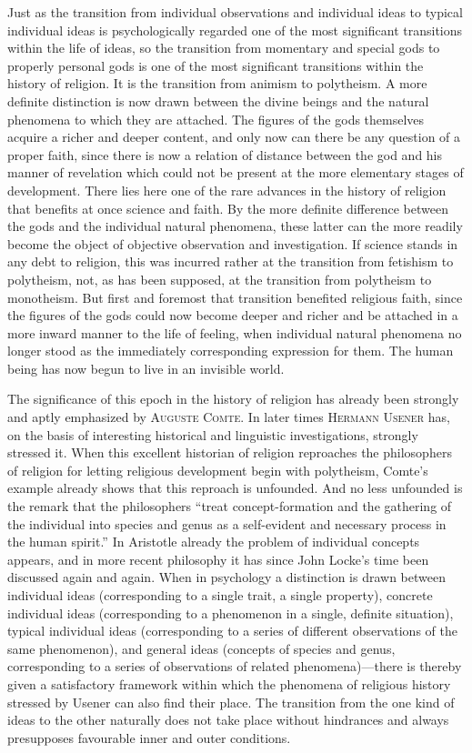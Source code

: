 \documentclass[12pt,a4paper]{book}
\newcommand{\opage}[1]{\marginnote{\footnotesize\textit{[#1]}}}
\begin{document}
Just as the transition from individual observations and individual ideas to typical
individual ideas is psychologically regarded one of the most significant transitions
within the life of ideas, so the transition from momentary and special gods to
properly personal gods is one of the most significant transitions within the history
of religion. It is the transition from animism to polytheism. A more definite
distinction is now drawn between the divine beings and the natural phenomena to which
they are attached. The figures of the gods themselves acquire a richer and deeper
content, and only now can there be any question of a proper faith, since there is now
a relation of distance between the god and his manner of revelation which could not
be present at the more elementary stages of development. There lies here one of the
rare advances in the history of religion that benefits at once science and faith. By
the more definite difference between the gods and the individual natural phenomena,
these latter can the more readily become the object of objective observation and
investigation. If science stands in any debt to religion, this was incurred rather at
the transition from fetishism to polytheism, not, as has been supposed, at the
transition from polytheism to monotheism. But first and foremost that transition
benefited religious faith, since the figures of the gods could 
\opage{94}now become deeper and
richer and be attached in a more inward manner to the life of feeling, when individual
natural phenomena no longer stood as the immediately corresponding expression for them.
The human being has now begun to live in an invisible world.

The significance of this epoch in the history of religion has already been strongly and
aptly emphasized by \textsc{Auguste Comte}. In later times \textsc{Hermann Usener} has,
on the basis of interesting historical and linguistic investigations, strongly stressed
it. When this excellent historian of religion reproaches the philosophers of religion
for letting religious development begin with polytheism, Comte's example already shows
that this reproach is unfounded. And no less unfounded is the remark that the
philosophers ``treat concept-formation and the gathering of the individual into species
and genus as a self-evident and necessary process in the human spirit.'' In Aristotle
already the problem of individual concepts appears, and in more recent philosophy it
has since John Locke's time been discussed again and again. When in psychology a
distinction is drawn between individual ideas (corresponding to a single trait, a single
property), concrete individual ideas (corresponding to a phenomenon in a single, definite
situation), typical individual ideas (corresponding to a series of different observations
of the same phenomenon), and general ideas (concepts of species and genus, corresponding
to a series of observations of related phenomena)---there is thereby given a satisfactory
framework within which the phenomena of religious history stressed by Usener can also find
their place. The transition from the one kind of ideas to the other naturally does not
take place without hindrances and always presupposes favourable inner and outer conditions.
\end{document}
